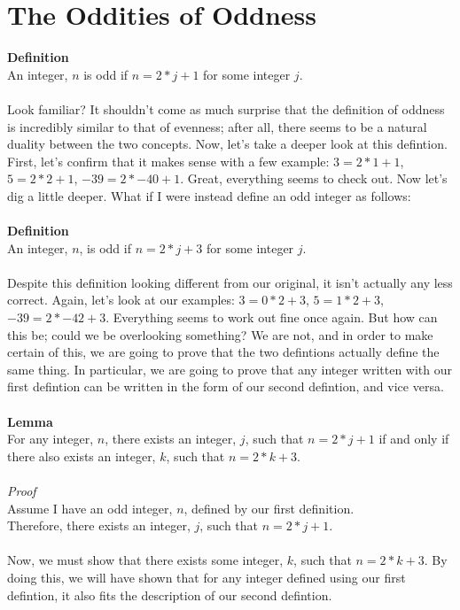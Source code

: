 \documentclass[a4paper,12pt]{article}
\begin{document}
\section{The Oddities of Oddness}
\textbf{Definition}\\
An integer, $n$ is odd if $n = 2*j + 1$ for some integer $j$.\\
\\
Look familiar? It shouldn't come as much surprise that the definition of oddness is incredibly similar to that of evenness; after all, there seems to be a natural duality between the two concepts. Now, let's take a deeper look at this defintion. First, let's confirm that it makes sense with a few example: $3 = 2*1 + 1$, $5 = 2*2 + 1$, $-39 = 2*-40 + 1$. Great, everything seems to check out. Now let's dig a little deeper. What if I were instead define an odd integer as follows:\\
\\
\textbf{Definition}\\
An integer, $n$, is odd if $n = 2*j + 3$ for some integer $j$.\\
\\
Despite this definition looking different from our original, it isn't actually any less correct. Again, let's look at our examples: $3 = 0*2 + 3$, $5 = 1*2 + 3$, $-39 = 2*-42 + 3$. Everything seems to work out fine once again. But how can this be; could we be overlooking something? We are not, and in order to make certain of this, we are going to prove that the two defintions actually define the same thing. In particular, we are going to prove that any integer written with our first defintion can be written in the form of our second defintion, and vice versa.\\
\\
\textbf{Lemma}\\
For any integer, $n$, there exists an integer, $j$, such that $n = 2*j + 1$ if and only if there also exists an integer, $k$, such that $n = 2*k + 3$.\\
\\ 
\textit{Proof}\\
Assume I have an odd integer, $n$, defined by our first definition.\\
Therefore, there exists an integer, $j$, such that $n = 2*j + 1$.\\
\\
Now, we must show that there exists some integer, $k$, such that $n = 2*k + 3$. By doing this, we will have shown that for any integer defined using our first defintion, it also fits the description of our second defintion.\\
\end{document}
